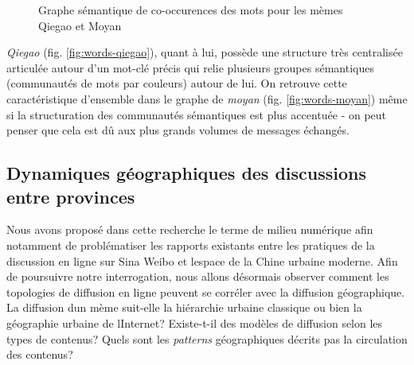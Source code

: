 \begin{figure}[h!]
    \centering
    
  \caption{
    Graphe s\'emantique de co-occurences des mots pour les m\`emes Qiegao et Moyan
  }
\end{figure}


\textit{Qiegao} (fig. \ref{fig:words-qiegao}), quant \`a lui, poss\`ede une structure tr\`es centralis\'ee articul\'ee autour d{\textquoteright}un mot-cl\'e pr\'ecis qui relie plusieurs groupes s\'emantiques (communaut\'es de mots par couleurs) autour de lui. On retrouve cette caract\'eristique d{\textquoteright}ensemble dans le graphe de \textit{moyan} (fig. \ref{fig:words-moyan}) m\^eme si la structuration des communaut\'es s\'emantiques est plus accentu\'ee - on peut penser que cela est d\^u aux plus grands volumes de messages \'echang\'es.

\subsection[Dynamiques g\'eographiques des discussions entre provinces]{Dynamiques g\'eographiques des discussions entre provinces}

Nous avons propos\'e dans cette recherche le terme de milieu num\'erique afin notamment de probl\'ematiser les rapports existants entre les pratiques de la discussion en ligne sur Sina Weibo et l{\textquotesingle}espace de la Chine urbaine moderne. Afin de poursuivre notre interrogation, nous allons d\'esormais observer comment les topologies de diffusion en ligne peuvent se corr\'eler avec la diffusion g\'eographique. La diffusion d{\textquotesingle}un m\`eme suit-elle la hi\'erarchie urbaine classique ou bien la g\'eographie urbaine de l{\textquotesingle}Internet? Existe-t-il des mod\`eles de diffusion selon les types de contenus? Quels sont les \textit{patterns }g\'eographiques d\'ecrits pas la circulation des contenus? 

